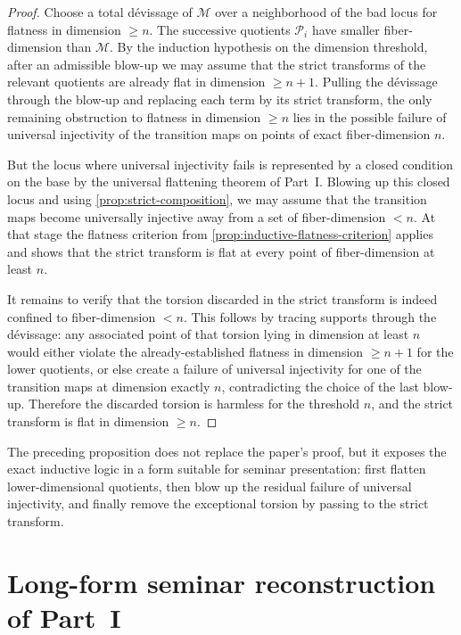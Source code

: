 \documentclass[11pt,oneside]{article}
\newcommand{\M}{\mathcal M}
\newcommand{\Pcal}{\mathcal P}
\begin{document}
\begin{proof}
Choose a total d\'evissage of $\M$ over a neighborhood of the bad locus for flatness in dimension $\ge n$.  The successive quotients $\Pcal_i$ have smaller fiber-dimension than $\M$.  By the induction hypothesis on the dimension threshold, after an admissible blow-up we may assume that the strict transforms of the relevant quotients are already flat in dimension $\ge n+1$.  Pulling the d\'evissage through the blow-up and replacing each term by its strict transform, the only remaining obstruction to flatness in dimension $\ge n$ lies in the possible failure of universal injectivity of the transition maps on points of exact fiber-dimension $n$.

But the locus where universal injectivity fails is represented by a closed condition on the base by the universal flattening theorem of Part~I.  Blowing up this closed locus and using \cref{prop:strict-composition}, we may assume that the transition maps become universally injective away from a set of fiber-dimension $<n$.  At that stage the flatness criterion from \cref{prop:inductive-flatness-criterion} applies and shows that the strict transform is flat at every point of fiber-dimension at least $n$.

It remains to verify that the torsion discarded in the strict transform is indeed confined to fiber-dimension $<n$.  This follows by tracing supports through the d\'evissage: any associated point of that torsion lying in dimension at least $n$ would either violate the already-established flatness in dimension $\ge n+1$ for the lower quotients, or else create a failure of universal injectivity for one of the transition maps at dimension exactly $n$, contradicting the choice of the last blow-up.  Therefore the discarded torsion is harmless for the threshold $n$, and the strict transform is flat in dimension $\ge n$.
\end{proof}

The preceding proposition does not replace the paper's proof, but it exposes the exact inductive logic in a form suitable for seminar presentation: first flatten lower-dimensional quotients, then blow up the residual failure of universal injectivity, and finally remove the exceptional torsion by passing to the strict transform.




\section{Long-form seminar reconstruction of Part~I}
\end{document}
